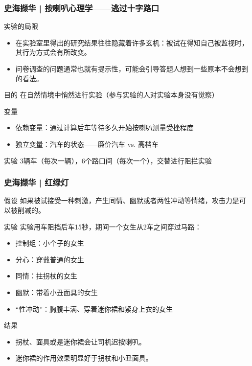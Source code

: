 \begin{frame}
  \frametitle{史海撷华 | 按喇叭心理学——逃过十字路口}
  \begin{block}{实验的局限}
    \begin{itemize}
      \item 在实验室里得出的研究结果往往隐藏着许多玄机：被试在得知自己被监视时，其行为方式会有所改变。
      \item 问卷调查的问题通常也就有提示性，可能会引导答题人想到一些原本不会想到的看法。
    \end{itemize}
  \end{block}
  \vspace{-0.5em}
  \pause
  \begin{block}{目的}
  在自然情境中悄然进行实验（参与实验的人对实验本身没有觉察）
  \end{block}
  \vspace{-0.5em}
  \pause
  \begin{block}{变量}
    \begin{itemize}
      \item 依赖变量：通过计算后车等待多久开始按喇叭测量受挫程度
      \item 独立变量：汽车的状态——廉价汽车 vs. 高档车
    \end{itemize}
  \end{block}
  \vspace{-0.5em}
  \pause
  \begin{block}{实验}
 3辆车（每次一辆），6个路口间（每次一个），交替进行阻拦实验 
  \end{block}
\end{frame}

\begin{frame}
  \frametitle{史海撷华 | 红绿灯}
  \begin{block}{假设}
    如果被试接受一种刺激，产生同情、幽默或者两性冲动等情绪，攻击力是可以被削减的。
  \end{block}
  \vspace{-0.4em}
  \pause
  \begin{block}{实验}
    实验用车阻挡后车15秒，期间一个女生从2车之间穿过马路：
    \begin{itemize}
      \item 控制组：小个子的女生
      \item 分心：穿戴普通的女生
      \item 同情：拄拐杖的女生
      \item 幽默：带着小丑面具的女生
      \item “性冲动”：胸腹丰满、穿着迷你裙和紧身上衣的女生
    \end{itemize}
  \end{block}
  \vspace{-0.4em}
  \pause
  \begin{block}{结果}
    \begin{itemize}
      \item 拐杖、面具或是迷你裙会让司机迟按喇叭。
      \item 迷你裙的作用效果明显好于拐杖和小丑面具。
    \end{itemize}
  \end{block}
\end{frame}


